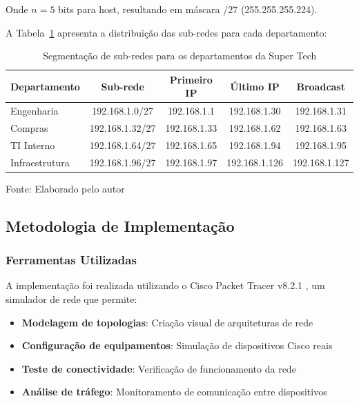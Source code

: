 Onde $n = 5$ bits para host, resultando em máscara /27 (255.255.255.224).

A Tabela~\ref{tab:subredes_supertech} apresenta a distribuição das sub-redes para cada departamento:

\begin{table}[H]
\centering
    \caption{Segmentação de sub-redes para os departamentos da Super Tech}
    \begin{tabular}{|l|c|c|c|c|}
    \hline
    \textbf{Departamento} & \textbf{Sub-rede} & \textbf{Primeiro IP} & \textbf{Último IP} & \textbf{Broadcast} \\
    \hline
    Engenharia & 192.168.1.0/27 & 192.168.1.1 & 192.168.1.30 & 192.168.1.31 \\
    \hline
    Compras & 192.168.1.32/27 & 192.168.1.33 & 192.168.1.62 & 192.168.1.63 \\
    \hline
    TI Interno & 192.168.1.64/27 & 192.168.1.65 & 192.168.1.94 & 192.168.1.95 \\
    \hline
    Infraestrutura & 192.168.1.96/27 & 192.168.1.97 & 192.168.1.126 & 192.168.1.127 \\
    \hline
    \end{tabular}

\label{tab:subredes_supertech}

{\fontsize{10pt}{\baselineskip}\selectfont
Fonte: Elaborado pelo autor}
\end{table}

\subsection{Metodologia de Implementação}

\subsubsection{Ferramentas Utilizadas}

A implementação foi realizada utilizando o Cisco Packet Tracer v8.2.1 \cite{cisco2023packettracer}, um simulador de rede que permite:

\begin{itemize}
    \item \textbf{Modelagem de topologias}: Criação visual de arquiteturas de rede
    \item \textbf{Configuração de equipamentos}: Simulação de dispositivos Cisco reais
    \item \textbf{Teste de conectividade}: Verificação de funcionamento da rede
    \item \textbf{Análise de tráfego}: Monitoramento de comunicação entre dispositivos
\end{itemize}

